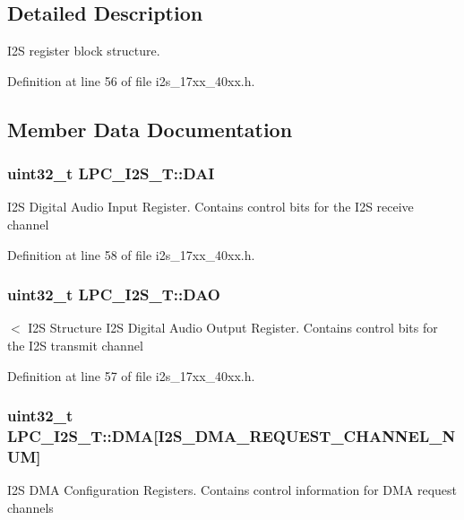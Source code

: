 \subsection{Detailed Description}
I2S register block structure. 

Definition at line 56 of file i2s\+\_\+17xx\+\_\+40xx.\+h.



\subsection{Member Data Documentation}
\subsubsection[{\texorpdfstring{D\+AI}{DAI}}]{ uint32\+\_\+t L\+P\+C\+\_\+\+I2\+S\+\_\+\+T\+::\+D\+AI}\hypertarget{structLPC__I2S__T_ab94e2f49e7d70f8b19c3d74f2e67878e}{}\label{structLPC__I2S__T_ab94e2f49e7d70f8b19c3d74f2e67878e}
I2S Digital Audio Input Register. Contains control bits for the I2S receive channel 

Definition at line 58 of file i2s\+\_\+17xx\+\_\+40xx.\+h.

\subsubsection[{\texorpdfstring{D\+AO}{DAO}}]{ uint32\+\_\+t L\+P\+C\+\_\+\+I2\+S\+\_\+\+T\+::\+D\+AO}\hypertarget{structLPC__I2S__T_ad574a0e2f1cdec634e05ee8176c0450e}{}\label{structLPC__I2S__T_ad574a0e2f1cdec634e05ee8176c0450e}
$<$ I2S Structure I2S Digital Audio Output Register. Contains control bits for the I2S transmit channel 

Definition at line 57 of file i2s\+\_\+17xx\+\_\+40xx.\+h.

\subsubsection[{\texorpdfstring{D\+MA}{DMA}}]{ uint32\+\_\+t L\+P\+C\+\_\+\+I2\+S\+\_\+\+T\+::\+D\+MA\mbox{[}{\bf I2\+S\+\_\+\+D\+M\+A\+\_\+\+R\+E\+Q\+U\+E\+S\+T\+\_\+\+C\+H\+A\+N\+N\+E\+L\+\_\+\+N\+UM}\mbox{]}}\hypertarget{structLPC__I2S__T_a2259283a5ad23aa09617861948df25d7}{}\label{structLPC__I2S__T_a2259283a5ad23aa09617861948df25d7}
I2S D\+MA Configuration Registers. Contains control information for D\+MA request channels 

